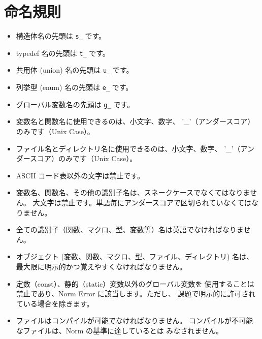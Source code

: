 \documentclass{42-ja}
\begin{document}
    \section{命名規則}

        \begin{itemize}

            \item 構造体名の先頭は
                \texttt{s\_} です。

            \item typedef 名の先頭は
                \texttt{t\_} です。

			\item 共用体 (union) 名の先頭は \texttt{u\_} です。

			\item 列挙型 (enum) 名の先頭は \texttt{e\_} です。

            \item グローバル変数名の先頭は \texttt{g\_} です。

            \item 変数名と関数名に使用できるのは、小文字、数字、
				'\_'（アンダースコア）のみです（Unix Case）。

            \item ファイル名とディレクトリ名に使用できるのは、小文字、数字、
				'\_'（アンダースコア）のみです（Unix Case）。

            \item ASCII コード表以外の文字は禁止です。

            \item 変数名、関数名、その他の識別子名は、スネークケースでなくてはなりません。
				大文字は禁止です。単語毎にアンダースコアで区切られていなくてはなりません。

            \item 全ての識別子（関数、マクロ、型、変数等）名は英語でなければなりません。

			\item オブジェクト (変数、関数、マクロ、型、ファイル、ディレクトリ)
				名は、最大限に明示的かつ覚えやすくなければなりません。

            \item 定数（const）、静的（static）変数以外のグローバル変数を
				使用することは禁止であり、Norm Error に該当します。ただし、
				課題で明示的に許可されている場合を除きます。

            \item ファイルはコンパイルが可能でなければなりません。
				コンパイルが不可能なファイルは、Norm の基準に達しているとは
				みなされません。
        \end{itemize}
\newpage
\end{document}
